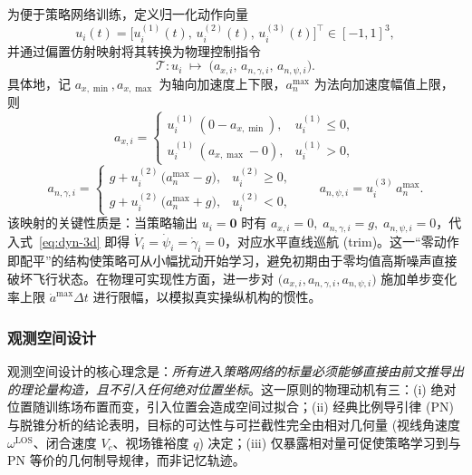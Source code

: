 为便于策略网络训练，定义归一化动作向量
\begin{equation}
u_i(t)=\bigl[u_i^{(1)}(t),\,u_i^{(2)}(t),\,u_i^{(3)}(t)\bigr]^{\top}\in[-1,1]^3,
\end{equation}
并通过偏置仿射映射将其转换为物理控制指令
\begin{equation}
\mathcal{T}:u_i\;\longmapsto\;\bigl(a_{x,i},\,a_{n,\gamma,i},\,a_{n,\psi,i}\bigr).
\end{equation}
具体地，记 $a_{x,\min},a_{x,\max}$ 为轴向加速度上下限，$a_{n}^{\max}$ 为法向加速度幅值上限，则
\begin{equation}
a_{x,i}=
\begin{cases}
u_i^{(1)}\,(0-a_{x,\min}), & u_i^{(1)}\le 0,\\[2pt]
u_i^{(1)}\,(a_{x,\max}-0), & u_i^{(1)}>0,
\end{cases}
\label{eq:act-ax}
\end{equation}
\begin{equation}
a_{n,\gamma,i}=
\begin{cases}
g+u_i^{(2)}\,\bigl(a_{n}^{\max}-g\bigr), & u_i^{(2)}\ge 0,\\[2pt]
g+u_i^{(2)}\,\bigl(a_{n}^{\max}+g\bigr), & u_i^{(2)}<0,
\end{cases}
\qquad
a_{n,\psi,i}=u_i^{(3)}\,a_{n}^{\max}.
\label{eq:act-an}
\end{equation}
该映射的关键性质是：当策略输出 $u_i=\mathbf{0}$ 时有 $a_{x,i}=0,\;a_{n,\gamma,i}=g,\;a_{n,\psi,i}=0$，代入式~\eqref{eq:dyn-3d} 即得 $\dot V_i=\dot\psi_i=\dot\gamma_i=0$，对应水平直线巡航 (trim)。这一“零动作即配平”的结构使策略可从小幅扰动开始学习，避免初期由于零均值高斯噪声直接破坏飞行状态。在物理可实现性方面，进一步对 $\bigl(a_{x,i},a_{n,\gamma,i},a_{n,\psi,i}\bigr)$ 施加单步变化率上限 $\dot a^{\max}\Delta t$ 进行限幅，以模拟真实操纵机构的惯性。

\subsubsection{观测空间设计}
\label{subsec:rl-obs}

观测空间设计的核心理念是：\emph{所有进入策略网络的标量必须能够直接由前文推导出的理论量构造，且不引入任何绝对位置坐标}。这一原则的物理动机有三：(i) 绝对位置随训练场布置而变，引入位置会造成空间过拟合；(ii) 经典比例导引律 (PN) 与脱锥分析的结论表明，目标的可达性与可拦截性完全由相对几何量 (视线角速度 $\omega^{\mathrm{LOS}}$、闭合速度 $V_c$、视场锥裕度 $q$) 决定；(iii) 仅暴露相对量可促使策略学习到与 PN 等价的几何制导规律，而非记忆轨迹。

